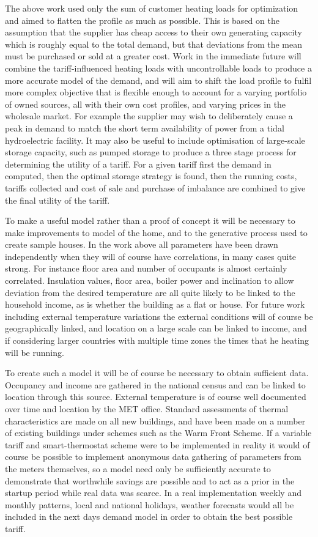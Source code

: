 \documentclass[a4paper, 10 pt, conference]{ieeeconf}  %
\begin{document}
The above work used only the sum of customer heating loads for optimization and aimed to flatten the profile as much as possible. This is based on the assumption that the supplier has cheap access to their own generating capacity which is roughly equal to the total demand, but that deviations from the mean must be purchased or sold at a greater cost. Work in the immediate future will combine the tariff-influenced heating loads with uncontrollable loads to produce a more accurate model of the demand, and will aim to shift the load profile to fulfil more complex objective that is flexible enough to account for a varying portfolio of owned sources, all with their own cost profiles, and varying prices in the wholesale market. For example the supplier may wish to deliberately cause a peak in demand to match the short term availability of power from a tidal hydroelectric facility. It may also be useful to include optimisation of large-scale storage capacity, such as pumped storage to produce a three stage process for determining the utility of a tariff. For a given tariff first the demand in computed, then the optimal storage strategy is found, then the running costs, tariffs collected and cost of sale and purchase of imbalance are combined to give the final utility of the tariff.

To make a useful model rather than a proof of concept it will be necessary to make improvements to model of the home, and to the generative process used to create sample houses. In the work above all parameters have been drawn independently when they will of course have correlations, in many cases quite strong. For instance floor area and number of occupants is almost certainly correlated. Insulation values, floor area, boiler power and inclination to allow deviation from the desired temperature are all quite likely to be linked to the household income, as is whether the building as a flat or house. For future work including external temperature variations the external conditions will of course be geographically linked, and location on a large scale can be linked to income, and if considering larger countries with multiple time zones the times that he heating will be running.

To create such a model it will be of course be necessary to obtain sufficient data. Occupancy and income are gathered in the national census and can be linked to location through this source. External temperature is of course well documented over time and location by the MET office. Standard assessments of thermal characteristics are made on all new buildings, and have been made on a number of existing buildings under schemes such as the Warm Front Scheme\cite{warmfront}. If a variable tariff and smart-thermostat scheme were to be implemented in reality it would of course be possible to implement anonymous data gathering of parameters from the meters themselves, so a model need only be sufficiently accurate to demonstrate that worthwhile savings are possible and to act as a prior in the startup period while real data was scarce. In a real implementation weekly and monthly patterns, local and national holidays, weather forecasts would all be included in the next days demand model in order to obtain the best possible tariff.
\end{document}
